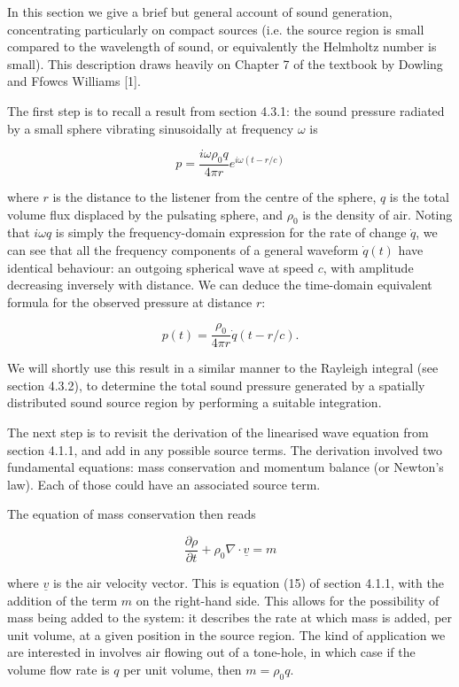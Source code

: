   In this section we give a brief but general account of sound generation, 
  concentrating particularly on compact sources (i.e. the source region is 
  small compared to the wavelength of sound, or equivalently the Helmholtz 
  number is small). This description draws heavily on Chapter 7 of the textbook 
  by Dowling and Ffowcs Williams [1]. 

  The first step is to recall a result from section 4.3.1: the sound pressure 
  radiated by a small sphere vibrating sinusoidally at frequency $\omega$ is 

  $$p=\dfrac{i \omega \rho_0 q}{4 \pi r} e^{i \omega(t-r/c)} \tag{1}$$ 

  where $r$ is the distance to the listener from the centre of the sphere, $q$ 
  is the total volume flux displaced by the pulsating sphere, and $\rho_0$ is 
  the density of air. Noting that $i \omega q$ is simply the frequency-domain 
  expression for the rate of change $\dot{q}$, we can see that all the 
  frequency components of a general waveform $\dot{q}(t)$ have identical 
  behaviour: an outgoing spherical wave at speed $c$, with amplitude decreasing 
  inversely with distance. We can deduce the time-domain equivalent formula for 
  the observed pressure at distance $r$: 

  $$p(t)=\dfrac{\rho_0 }{4 \pi r} \dot{q}(t-r/c) . \tag{2}$$ 

  We will shortly use this result in a similar manner to the Rayleigh integral 
  (see section 4.3.2), to determine the total sound pressure generated by a 
  spatially distributed sound source region by performing a suitable 
  integration. 

  The next step is to revisit the derivation of the linearised wave equation 
  from section 4.1.1, and add in any possible source terms. The derivation 
  involved two fundamental equations: mass conservation and momentum balance 
  (or Newton's law). Each of those could have an associated source term. 

  The equation of mass conservation then reads 

  $$\dfrac{\partial \rho}{\partial t} + \rho_0 \nabla \cdot \underline{v} = m 
  \tag{3}$$ 

  where $\underline{v}$ is the air velocity vector. This is equation (15) of 
  section 4.1.1, with the addition of the term $m$ on the right-hand side. This 
  allows for the possibility of mass being added to the system: it describes 
  the rate at which mass is added, per unit volume, at a given position in the 
  source region. The kind of application we are interested in involves air 
  flowing out of a tone-hole, in which case if the volume flow rate is $q$ per 
  unit volume, then $m=\rho_0 q$. 

